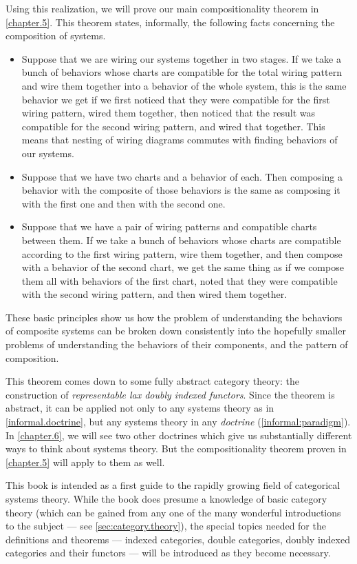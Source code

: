 \documentclass[DynamicalBook]{subfiles}
\begin{document}
Using this realization, we will prove our main compositionality theorem in \cref{chapter.5}. This theorem states, informally, the following facts concerning the composition of systems.
\begin{itemize}
  \item Suppose that we are wiring
    our systems together in two stages. If we take a
    bunch of behaviors whose charts are compatible for the total wiring pattern
    and wire them together into a behavior of the whole system, this is the same
    behavior we get if we first noticed that they were compatible for the first
    wiring pattern, wired them together, then noticed that the result was
    compatible for the second wiring pattern, and wired that together. This
    means that nesting of wiring diagrams commutes with finding behaviors of our systems.
  \item Suppose that we have two
    charts and a behavior of each. Then composing a behavior with the composite of those behaviors is the same as composing
    it with the first one and then with the second one.
  \item Suppose that we have a pair of
    wiring patterns and compatible charts between them. If we
    take a bunch of behaviors whose charts are compatible according to the first
    wiring pattern, wire them together, and then compose with a behavior of the
    second chart, we get the same thing as if we compose them all with behaviors
    of the first chart, noted that they were compatible with the second wiring
    pattern, and then wired them together.
\end{itemize}

These basic principles show us how the problem of understanding the behaviors of composite systems can be broken down consistently into the hopefully smaller problems of understanding the behaviors of their components, and the pattern of composition.

This theorem comes down to some fully abstract category theory: the construction of \emph{representable lax doubly indexed functors}. Since the theorem is abstract, it can be applied not only to any systems theory as in \cref{informal.doctrine}, but any systems theory in any \emph{doctrine} (\cref{informal:paradigm}). In \cref{chapter.6}, we will see two other doctrines which give us substantially different ways to think about systems theory. But the compositionality theorem proven in \cref{chapter.5} will apply to them as well.

This book is intended as a first guide to the rapidly growing field of categorical systems theory. While the book does presume a knowledge of basic category theory (which can be gained from any one of the many wonderful introductions to the subject --- see \cref{sec:category.theory}), the special topics needed for the definitions and theorems --- indexed categories, double categories, doubly indexed categories and their functors --- will be introduced as they become necessary.
\end{document}
